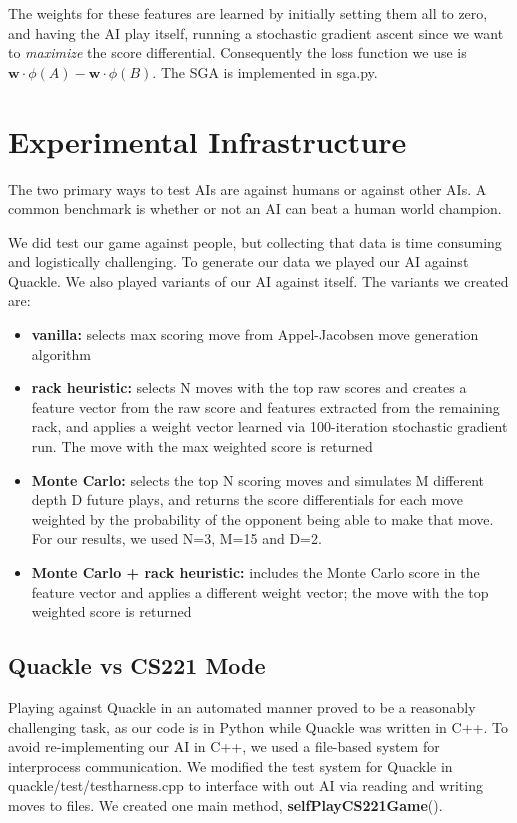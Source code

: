 \documentclass[12pt]{article}
\begin{document}
The weights for these features are learned by initially setting them
all to zero, and having the AI play itself, running a stochastic
gradient ascent since we want to \emph{maximize} the score
differential. Consequently the loss function we use is $\mathbf{w}
\cdot \phi(A) - \mathbf{w}\cdot \phi(B)$. The SGA is implemented in
sga.py.

\section*{Experimental Infrastructure}
The two primary ways to test AIs are against humans or against other
AIs. A common benchmark is whether or not an AI can beat a human world
champion.

We did test our game against people, but collecting that data is time
consuming and logistically challenging. To generate our data we played
our AI against Quackle. We also played variants of our AI against
itself. The variants we created are:

\begin{itemize}
\item \textbf{vanilla:} selects max scoring move from Appel-Jacobsen
  move generation algorithm
\item \textbf{rack heuristic:} selects N moves with the top raw scores
  and creates a feature vector from the raw score and features
  extracted from the remaining rack, and applies a weight vector
  learned via 100-iteration stochastic gradient run. The move with the
  max weighted score is returned
\item \textbf{Monte Carlo:} selects the top N scoring moves and
  simulates M different depth D future plays, and returns the score
  differentials for each move weighted by the probability of the
  opponent being able to make that move. For our results, we used N=3,
  M=15 and D=2.
\item \textbf{Monte Carlo + rack heuristic:} includes the Monte Carlo
  score in the feature vector and applies a different weight vector;
  the move with the top weighted score is returned
\end{itemize}

\subsection*{Quackle vs CS221 Mode}
Playing against Quackle in an automated manner proved to be a
reasonably challenging task, as our code is in Python while Quackle
was written in C++. To avoid re-implementing our AI in C++, we used a
file-based system for interprocess communication. We modified the test
system for Quackle in quackle/test/testharness.cpp to interface with
out AI via reading and writing moves to files. We created one main
method, \textbf{selfPlayCS221Game}().
\end{document}
